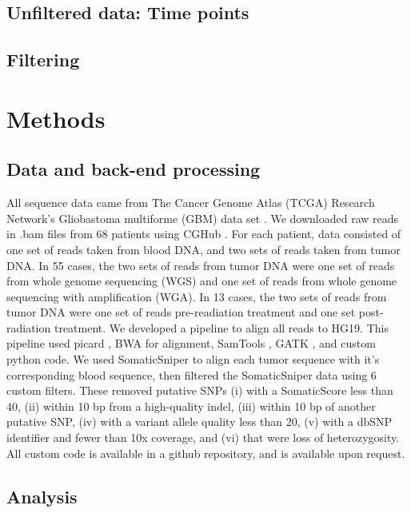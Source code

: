 \documentclass[11pt]{article} %
\begin{document}
\subsection{Unfiltered data: Time points}

\subsection{Filtering}

\section{Methods}

\subsection{Data and back-end processing}

All sequence data came from The Cancer Genome Atlas (TCGA) Research Network's Gliobastoma multiforme (GBM) data set \cite{TCGA-GBM}. We downloaded raw reads in .bam files from 68 patients using CGHub \cite{CGHub}. For each patient, data consisted of one set of reads taken from blood DNA, and two sets of reads taken from tumor DNA. In 55 cases, the two sets of reads from tumor DNA were one set of reads from whole genome sequencing (WGS) and one set of reads from whole genome sequencing with amplification (WGA). In 13 cases, the two sets of reads from tumor DNA were one set of reads pre-readiation treatment and one set post-radiation treatment. We developed a pipeline to align all reads to HG19. This pipeline used picard \cite{picard}, BWA \cite{BWA} for alignment, SamTools \cite{SAMtools}, GATK \cite{GATK}, and custom python code. We used SomaticSniper \cite{SomaticSniper} to align each tumor sequence with it's corresponding blood sequence, then filtered the SomaticSniper data using 6 custom filters. These removed putative SNPs (i) with a SomaticScore less than 40, (ii) within 10 bp from a high-quality indel, (iii) within 10 bp of another putative SNP, (iv) with a variant allele quality less than 20, (v) with a dbSNP \cite{dbSNP} identifier and fewer than 10x coverage, and (vi) that were loss of heterozygosity. All custom code is available in a github repository, and is available upon request.

\subsection{Analysis}
\end{document}
